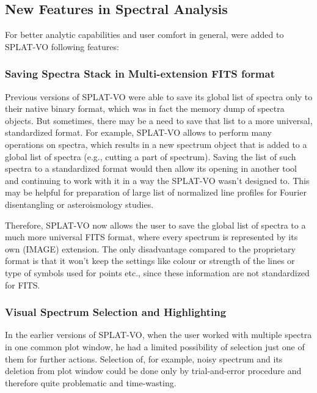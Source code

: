 \documentclass[final,authoryear,5p,times,twocolumn]{elsarticle}
\begin{document}
\subsection{New Features in Spectral Analysis}

\label{davids_functions}
For better analytic capabilities and user comfort in
general, were added \citep{and146bcthesis} to SPLAT-VO following features:

\subsubsection{Saving Spectra Stack in Multi-extension FITS format}

Previous versions of SPLAT-VO were able to save its global list of spectra only to
their native binary format, which was in fact the memory dump of spectra
objects. But sometimes, there may be a need to save that list to a more
universal, standardized format. For example, SPLAT-VO allows to perform many
operations on spectra, which results in a new spectrum object that is added to
a global list of spectra (e.g., cutting a part of spectrum). Saving the list of
such spectra to a standardized format would then allow its opening in another
tool and continuing to work with it in a way the SPLAT-VO wasn't designed to.
This may be helpful for preparation of large list of normalized line profiles
for Fourier disentangling or asteroismology studies.

Therefore, SPLAT-VO now allows the user to save the global list of spectra to a
much more universal FITS format, where every spectrum  is represented by its
own (IMAGE) extension.  The only disadvantage compared to the proprietary
format is that it won't keep the settings like colour or strength of the lines
or type of symbols used for points etc., since these information  are not
standardized for FITS.


\subsubsection{Visual Spectrum Selection and Highlighting}

In the earlier versions of SPLAT-VO, when the user worked with multiple
spectra in one common plot window, he  had a limited possibility of
selection just one of them for further actions. Selection of, for example, noisy
spectrum and its deletion from plot window could be done only by
trial-and-error procedure and therefore quite problematic and time-wasting.
\end{document}
